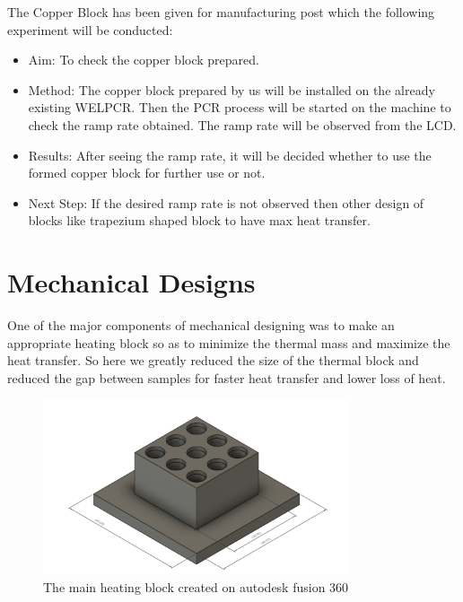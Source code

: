 \documentclass{article}
\begin{document}
The Copper Block has been given for manufacturing post which the following experiment will be conducted:
\begin{itemize}

\item Aim: To check the copper block prepared.
\item Method: The copper block prepared by us will be installed on the already existing WELPCR. Then the PCR process will be started on the machine to check the ramp rate obtained. The ramp rate will be observed from the LCD.
\item Results:  After seeing the ramp rate, it will be decided whether to use the formed copper block for further use or not.
\item Next Step: If the desired ramp rate is not observed then other design of blocks like trapezium shaped block to have max heat transfer.

\end{itemize}
\maketitle
\newpage
\section{Mechanical Designs}

One of the major components of mechanical designing was to make an appropriate heating block so as to minimize the thermal mass and maximize the heat transfer. So here we greatly reduced the size of the thermal block and reduced the gap between samples for faster heat transfer and lower loss of heat.


\begin{figure}[htp]
    \centering
    \includegraphics[width=9cm]{Images/Mainheatingblock.png}
    \caption{The main heating block created on autodesk fusion 360}
    \label{fig:galaxy}
\end{figure}
\end{document}
